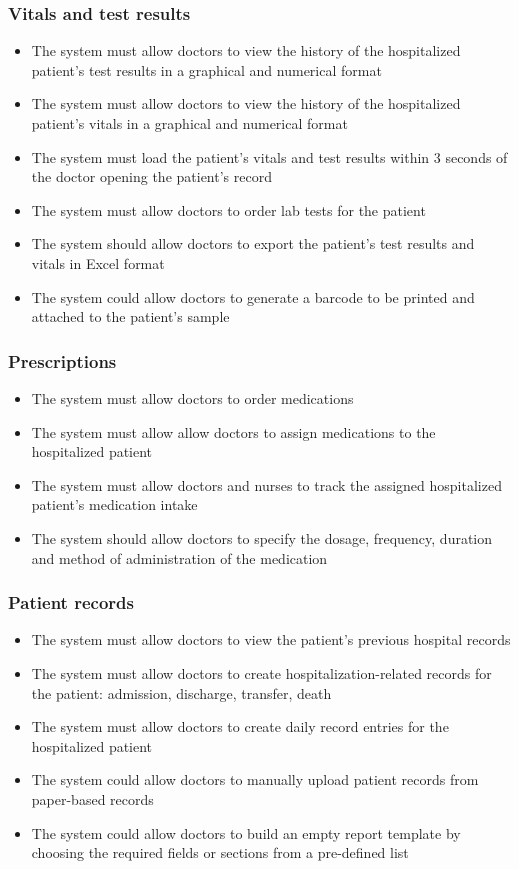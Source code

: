 \subsubsection{Vitals and test results}
\begin{itemize}
    \item The system must allow doctors to view the history of the hospitalized patient's test results in a graphical and numerical format
    \item The system must allow doctors to view the history of the hospitalized patient's vitals in a graphical and numerical format
    \item The system must load the patient's vitals and test results within 3 seconds of the doctor opening the patient's record
    \item The system must allow doctors to order lab tests for the patient
    \item The system should allow doctors to export the patient's test results and vitals in Excel format
    \item The system could allow doctors to generate a barcode to be printed and attached to the patient's sample
\end{itemize}

\subsubsection{Prescriptions}
\begin{itemize}
    \item The system must allow doctors to order medications
    \item The system must allow allow doctors to assign medications to the hospitalized patient
    \item The system must allow doctors and nurses to track the assigned hospitalized patient's medication intake
    \item The system should allow doctors to specify the dosage, frequency, duration and method of administration of the medication
\end{itemize}

\subsubsection{Patient records}
\begin{itemize}
    \item The system must allow doctors to view the patient's previous hospital records
    \item The system must allow doctors to create hospitalization-related records for the patient: admission, discharge, transfer, death
    \item The system must allow doctors to create daily record entries for the hospitalized patient
    \item The system could allow doctors to manually upload patient records from paper-based records
    \item The system could allow doctors to build an empty report template by choosing the required fields or sections from a pre-defined list
\end{itemize}

